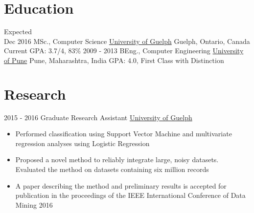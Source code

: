 \documentclass[letterpaper,UTF8]{twentysecondcv} %
\begin{document}
\makeprofile %

\section{Education}

\begin{twenty} %
	\twentyitem
    	{Expected \\ Dec 2016}
        {MSc., Computer Science}
        {\href{http://www.uoguelph.ca/}{University of Guelph}}
        {Guelph, Ontario, Canada}
        {Current GPA: 3.7/4, 83\%}
	\twentyitem
    	{2009 - 2013}
        {BEng., Computer Engineering}
        {\href{http://www.unipune.ac.in/}{University of Pune}}
        {Pune, Maharashtra, India}
        {GPA: 4.0, First Class with Distinction}
\end{twenty}


\section{Research}
\begin{twenty}
	\twentyitem
    	{2015 - 2016}
        {Graduate Research Assistant}
        {\href{http://www.uoguelph.ca/}{University of Guelph}}
        {}
        {
        {\begin{itemize}
        \item Performed classification using Support Vector Machine and multivariate regression analyses using Logistic Regression
        \item Proposed a novel method to reliably integrate large, noisy datasets. Evaluated the method on datasets containing six million records
        \item A paper describing the method and preliminary results is accepted for publication in the proceedings of the IEEE International Conference of Data Mining 2016
    \end{itemize}}
        }
\end{twenty}

\end{document}
